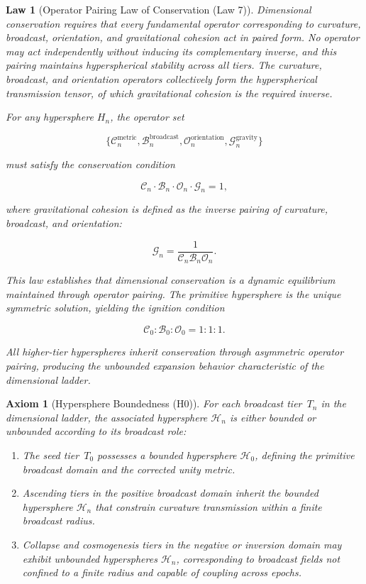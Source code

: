 \documentclass[final,onefignum,onetabnum]{siamart}
\newtheorem{law}{Law}
\newtheorem{axiom}{Axiom}
\begin{document}
\begin{law}[Operator Pairing Law of Conservation (Law 7)]
Dimensional conservation requires that every fundamental operator corresponding to curvature, broadcast, orientation, and gravitational cohesion act in paired form. No operator may act independently without inducing its complementary inverse, and this pairing maintains hyperspherical stability across all tiers. The curvature, broadcast, and orientation operators collectively form the hyperspherical transmission tensor, of which gravitational cohesion is the required inverse.

For any hypersphere $H_n$, the operator set


\[
\{\mathcal{C}_n^{\text{metric}}, \mathcal{B}_n^{\text{broadcast}}, \mathcal{O}_n^{\text{orientation}}, \mathcal{G}_n^{\text{gravity}}\}
\]


must satisfy the conservation condition


\[
\mathcal{C}_n \cdot \mathcal{B}_n \cdot \mathcal{O}_n \cdot \mathcal{G}_n = 1,
\]

where gravitational cohesion is defined as the inverse pairing of curvature, broadcast, and orientation:

\[
\mathcal{G}_n = \frac{1}{\mathcal{C}_n \mathcal{B}_n \mathcal{O}_n}.
\]

This law establishes that dimensional conservation is a dynamic equilibrium maintained through operator pairing. The primitive hypersphere is the unique symmetric solution, yielding the ignition condition

\[
\mathcal{C}_0 : \mathcal{B}_0 : \mathcal{O}_0 = 1 : 1 : 1.
\]

All higher-tier hyperspheres inherit conservation through asymmetric operator pairing, producing the unbounded expansion behavior characteristic of the dimensional ladder.
\end{law}

\begin{axiom}[Hypersphere Boundedness (H0)]
For each broadcast tier~$T_{n}$ in the dimensional ladder, the associated hypersphere $\mathcal{H}_{n}$ is either bounded or unbounded according to its broadcast role:

\begin{enumerate}
    \item The seed tier~$T_{0}$ possesses a bounded hypersphere $\mathcal{H}_{0}$, defining the primitive broadcast domain and the corrected unity metric.
    \item Ascending tiers in the positive broadcast domain inherit the bounded hypersphere $\mathcal{H}_{n}$ that constrain curvature transmission within a finite broadcast radius.
    \item Collapse and cosmogenesis tiers in the negative or inversion domain may exhibit unbounded hyperspheres $\mathcal{H}_{n}$, corresponding to broadcast fields not confined to a finite radius and capable of coupling across epochs.
\end{enumerate}
\end{axiom}
\end{document}
